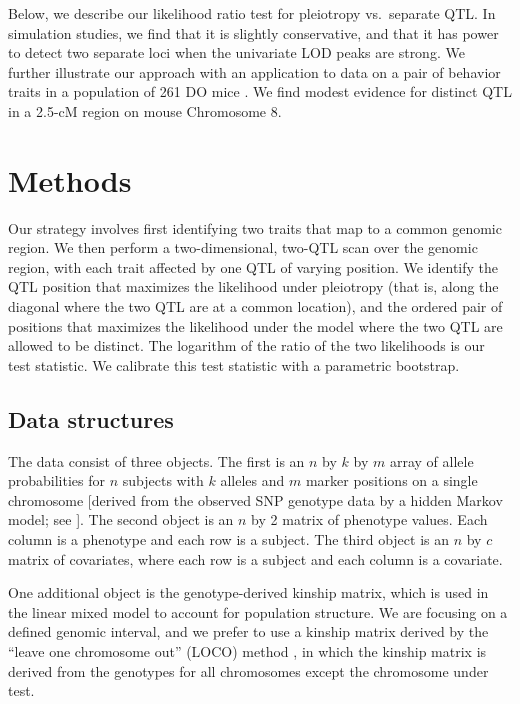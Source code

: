 \documentclass[oneside]{book}\usepackage[]{graphicx}\usepackage[]{color}
\begin{document}
Below, we describe our likelihood ratio test for pleiotropy vs.\
separate QTL. In simulation studies, we find that it is slightly
conservative, and that it has power to detect two separate loci when
the univariate LOD peaks are strong. We further illustrate our
approach with an application to data on a pair of behavior traits in
a population of 261 DO mice \citep{logan2013high,recla2014precise}.
We find modest evidence for distinct QTL in a 2.5-cM region on mouse
Chromosome 8.


\section{Methods}
\label{sec:materials:methods}

Our strategy involves first identifying two traits that map to a common
genomic region. We then perform a two-dimensional, two-QTL scan over
the genomic region, with each trait affected by one QTL of varying
position. We identify the QTL position that maximizes the likelihood
under pleiotropy (that is, along the diagonal where the two QTL are at
a common location), and the ordered pair of positions that maximizes
the likelihood under the model where the two QTL are allowed to be
distinct. The logarithm of the ratio of the two likelihoods is our
test statistic. We calibrate this test statistic with a parametric
bootstrap.

\subsection{Data structures}\label{sec:data-structures}

The data consist of three objects. The first is an $n$ by $k$ by $m$
array of allele probabilities for $n$ subjects with $k$ alleles and
$m$ marker positions on a single chromosome [derived from the observed
SNP genotype data by a hidden Markov model; see
\citet{broman2019rqtl2}]. The second object is an $n$ by 2 matrix of
phenotype values. Each column is a phenotype and each row is a
subject. The third object is an $n$ by $c$ matrix of covariates, where
each row is a subject and each column is a covariate.

One additional object is the genotype-derived kinship matrix, which is
used in the linear mixed model to account for population structure. We
are focusing on a defined genomic interval, and we prefer to use a
kinship matrix derived by the ``leave one chromosome out'' (LOCO)
method \citep{yang2014advantages}, in which the kinship matrix is
derived from the genotypes for all chromosomes except the chromosome
under test.
\end{document}

